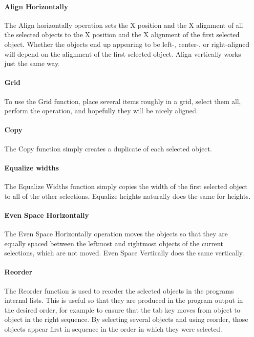 \paragraph{Align Horizontally}
The Align horizontally operation sets the X position and the X alignment
of all the selected objects to the X position and the X alignment of
the first selected object. Whether the objects end up appearing to be
left-, center-, or right-aligned will depend on the alignment of the
first selected object. {\textquotedbl}Align vertically{\textquotedbl}
works just the same way.

\paragraph{Grid}
To use the Grid function, place several items roughly in a grid, select
them all, perform the operation, and hopefully they will be nicely
aligned.

\paragraph{Copy}
The Copy function simply creates a duplicate of each selected object.

\paragraph{Equalize widths}
The Equalize Widths function simply copies the width of the first
selected object to all of the other selections. {\textquotedbl}Equalize
heights{\textquotedbl} naturally does the same for heights.

\paragraph{Even Space Horizontally}
The Even Space Horizontally operation moves the objects so that they are
equally spaced between the leftmost and rightmost objects of the
current selections, which are not moved. {\textquotedbl}Even Space
Vertically{\textquotedbl} does the same vertically.

\paragraph{Reorder}
The Reorder function is used to reorder the selected objects in the
program{\textquotesingle}s internal lists. This is useful so that they
are produced in the program output in the desired order, for example to
ensure that the tab key moves from object to object in the right
sequence. By selecting several objects and using reorder, those objects
appear first in sequence in the order in which they were selected.

